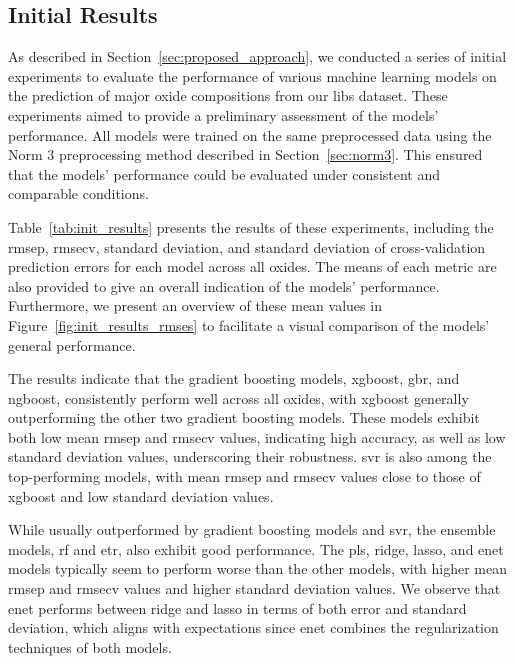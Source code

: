 \subsection{Initial Results}
As described in Section~\ref{sec:proposed_approach}, we conducted a series of initial experiments to evaluate the performance of various machine learning models on the prediction of major oxide compositions from our \gls{libs} dataset.
These experiments aimed to provide a preliminary assessment of the models' performance.
All models were trained on the same preprocessed data using the Norm 3 preprocessing method described in Section~\ref{sec:norm3}.
This ensured that the models' performance could be evaluated under consistent and comparable conditions.

Table~\ref{tab:init_results} presents the results of these experiments, including the \gls{rmsep}, \gls{rmsecv}, standard deviation, and standard deviation of cross-validation prediction errors for each model across all oxides.
The means of each metric are also provided to give an overall indication of the models' performance.
Furthermore, we present an overview of these mean values in Figure~\ref{fig:init_results_rmses} to facilitate a visual comparison of the models' general performance.

The results indicate that the gradient boosting models, \gls{xgboost}, \gls{gbr}, and \gls{ngboost}, consistently perform well across all oxides, with \gls{xgboost} generally outperforming the other two gradient boosting models.
These models exhibit both low mean \gls{rmsep} and \gls{rmsecv} values, indicating high accuracy, as well as low standard deviation values, underscoring their robustness.
\gls{svr} is also among the top-performing models, with mean \gls{rmsep} and \gls{rmsecv} values close to those of \gls{xgboost} and low standard deviation values.

While usually outperformed by gradient boosting models and \gls{svr}, the ensemble models, \gls{rf} and \gls{etr}, also exhibit good performance.
The \gls{pls}, ridge, \gls{lasso}, and \gls{enet} models typically seem to perform worse than the other models, with higher mean \gls{rmsep} and \gls{rmsecv} values and higher standard deviation values.
We observe that \gls{enet} performs between ridge and \gls{lasso} in terms of both error and standard deviation, which aligns with expectations since \gls{enet} combines the regularization techniques of both models.

